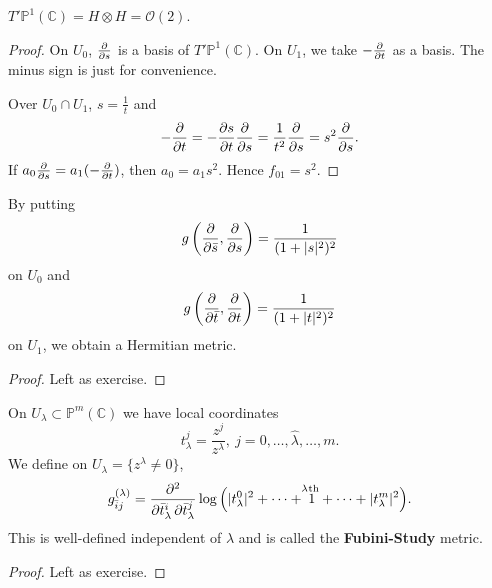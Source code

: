 \documentclass[12pt]{article}
\begin{document}
\begin{example}
  \(T'\mathbb{P}^1(\mathbb{C})=H\otimes H=\mathcal{O}(2)\).
\end{example}
\begin{proof}
  On \(U_0\), \(\pdv{}{s}\) is a basis of \(T'\mathbb{P}^1(\mathbb{C})\). On \(U_1\),
  we take \(-\pdv{}{t}\) as a basis. The minus sign is just for convenience.

  Over \(U_0\cap U_1\), \(s=\frac{1}{t}\) and \[
    -\pdv{}{t}=-\pdv{s}{t}\pdv{}{s}=\frac{1}{t^2}\pdv{}{s}=s^2\pdv{}{s}
  .\] If \(a_0\pdv{}{s}=a_1(-\pdv{}{t})\), then \(a_0=a_1s^2\). Hence \(f_{01}=s^2\).
\end{proof}

\begin{example}
  By putting \[
    g\left(\pdv{}{\bar{s}},\pdv{}{s}\right)=\frac{1}{(1+|s|^2)^2}
  \] on \(U_0\) and \[
    g\left(\pdv{}{\bar{t}},\pdv{}{t}\right)=\frac{1}{(1+|t|^2)^2}
  \] on \(U_1\), we obtain a Hermitian metric.
\end{example}
\begin{proof}
  Left as exercise.
\end{proof}

\begin{example}
  On \(U_\lambda\subset \mathbb{P}^m(\mathbb{C})\) we have local coordinates \[
    t_{\lambda}^j=\frac{z^j}{z^\lambda},\ j=0,\ldots,\hat{\lambda},\ldots,m
  .\] We define on \(U_\lambda=\{z^\lambda\neq 0\}\), \[
    g_{\bar{i}j}^{(\lambda)}=\pdv{}{\bar{t}_\lambda^i,\bar{t}_\lambda^j}
    \log\Big(|t_\lambda^0|^2+\cdots +\overset{\mathclap\lambda\text{ th}}{1}+\cdots
    +|t_\lambda^m|^2\Big)
  .\] This is well-defined independent of \(\lambda\) and is called the 
  \textbf{Fubini-Study} metric.
\end{example}
\begin{proof}
  Left as exercise.
\end{proof}
\end{document}
